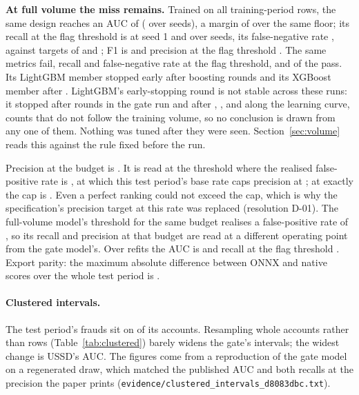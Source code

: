 \textbf{At full volume the miss remains.} Trained on all \nFvTrainRows{} training-period rows, the
same design reaches an AUC of \nFvAUC{} \nFvAUCci{} (\nFvSeedAUC{} over \nSeeds{} seeds), a margin of
\nFvMargin{} over the same floor; its recall at the flag threshold is \nFvRecallSix{}
\nFvRecallSixci{} at seed 1 and \nFvSeedRecallSix{} over \nSeeds{} seeds, its false-negative rate
\nFvFNR{}, against targets of \nTargetRecall{} and \nTargetFNR{}; F1 is \nFvFone{} and precision at
the flag threshold \nFvPrecSix{}. The same metrics fail, recall and false-negative rate at the flag
threshold, and \nFvPassed{} of the
\nGateMeasured{} pass. Its LightGBM member stopped early after \nFvLgbRounds{} boosting rounds and
its XGBoost member after \nFvXgbRounds{}. LightGBM's early-stopping round is not stable across these runs: it stopped after \nGateLGBRounds{} rounds in the gate run and after
\nLcLgbRoundsA{}, \nLcLgbRoundsB{}, \nLcLgbRoundsC{} and \nLcLgbRoundsD{} along the learning curve,
counts that do not follow the training volume, so no conclusion is drawn from any one of them.
Nothing was tuned after they were seen. Section~\ref{sec:volume} reads this against the rule fixed before the
run.

Precision at the \nFPRBudget{} budget is \nGatePrecFPR{}. It is read at the threshold where the
realised false-positive rate is \nGateRealisedFPR{}, at which this test period's base rate caps
precision at \nGatePrecCeilingRealised{}; at exactly \nFPRBudget{} the cap is \nGatePrecCeiling{}.
Even a perfect ranking could not exceed the cap, which is why the specification's precision target
at this rate was replaced (resolution D-01). The full-volume model's threshold for the same budget
realises a false-positive rate of \nFvRealisedFPR{}, so its recall and precision at that budget are
read at a different operating point from the gate model's. Over
\nSeeds{} refits the AUC is \nGateSeedAUC{} and recall at the flag threshold
\nGateSeedRecallSix{}. Export parity: the maximum absolute difference between ONNX and native
scores over the whole test period is \nGateOnnx{}.

\paragraph{Clustered intervals.} The test period's \nTestFraud{} frauds sit on \nCluFraudAccounts{} of
its \nCluTestAccounts{} accounts. Resampling whole accounts rather than rows
(Table~\ref{tab:clustered}) barely widens the gate's intervals; the widest change is USSD's AUC.
The figures come from a reproduction of the gate model on a regenerated draw, which matched the
published AUC and both recalls at the precision the paper prints
(\texttt{evidence/\allowbreak clustered\_\allowbreak intervals\_\allowbreak d8083dbc.txt}).


